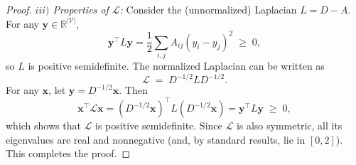 \documentclass[lettersize,journal]{IEEEtran}
\begin{document}
\begin{proof}
     \textit{$iii)$ Properties of $\mathcal{L}$:}
     Consider the (unnormalized) Laplacian $L = D - A$. For any
$\mathbf{y} \in \mathbb{R}^{|\mathcal{V}|}$,
\[
\mathbf{y}^\top L \mathbf{y}
= \frac{1}{2} \sum_{i,j} A_{ij} (y_i - y_j)^2 \;\geq\; 0,
\]
so $L$ is positive semidefinite. The normalized Laplacian can be written as
\[
\mathcal{L} \;=\; D^{-1/2} L D^{-1/2}.
\]
For any $\mathbf{x}$, let $\mathbf{y} = D^{-1/2} \mathbf{x}$. Then
\[
\mathbf{x}^\top \mathcal{L} \mathbf{x}
= (D^{-1/2}\mathbf{x})^\top L (D^{-1/2}\mathbf{x})
= \mathbf{y}^\top L \mathbf{y} \;\geq\; 0,
\]
which shows that $\mathcal{L}$ is positive semidefinite. Since
$\mathcal{L}$ is also symmetric, all its eigenvalues are real and
nonnegative (and, by standard results, lie in $[0,2]$). This completes the proof.


\end{proof}
\end{document}

